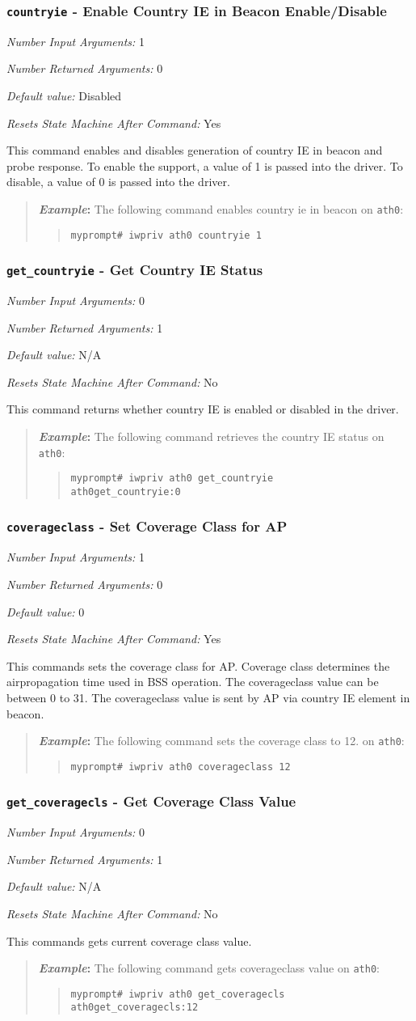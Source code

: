 \documentclass[10pt,fullpage]{article}
\newcommand{\mytt}[1]{{\texttt{#1}}}
\newcommand{\bv}{\begin{verse}}
\newcommand{\ev}{\end{verse}}
\newcommand{\cmd}[1]{{\texttt{myprompt\# #1}}}
\newcommand{\argdesc}[4]{\begin{description}
\itemsep -6pt
\item \textit{Number Input Arguments:} #1
\item \textit{Number Returned Arguments:} #2
\item \textit{Default value:} #3
\item \textit{Resets State Machine After Command:} #4
\end{description}
}
\newenvironment{example}{\begin{quote}\textbf{\textit{Example}:}}{\end{quote}}
\begin{document}
\subsubsection{\mytt{countryie} - Enable Country IE in Beacon Enable/Disable}
\argdesc{1}{0}{Disabled}{Yes}
This command enables and disables generation of country IE in beacon and probe
response.  To enable the support, a value of 1 is passed into the driver. 
To disable, a value of 0 is passed into the driver.
\begin{example}
  The following command enables country ie in beacon  on \mytt{ath0}:
  \bv
  \cmd{iwpriv ath0 countryie 1}
  \ev
\end{example}

\subsubsection{\mytt{get\_countryie} - Get Country IE Status}
\argdesc{0}{1}{N/A}{No}
This command returns whether country IE is enabled or disabled in
the driver.
\begin{example}
  The following command retrieves the country IE status on \mytt{ath0}:
  \bv
  \cmd{iwpriv ath0 get\_countryie}\\
  \mytt{ath0\hspace{32pt}get\_countryie:0}
  \ev
\end{example}

\subsubsection{\mytt{coverageclass} - Set Coverage Class for AP}
\argdesc{1}{0}{0}{Yes}
This commands sets the coverage class for AP. Coverage class determines the
airpropagation time used in BSS operation. The coverageclass value can be 
between 0 to 31. The coverageclass value is sent by AP via country IE
element in beacon.
\begin{example}
  The following command sets the coverage class to 12.
  on \mytt{ath0}:
  \bv
  \cmd{iwpriv ath0 coverageclass 12}\\
  \ev
\end{example}

\subsubsection{\mytt{get\_coveragecls} - Get Coverage Class Value}
\argdesc{0}{1}{N/A}{No}
This commands gets current coverage class value.
\begin{example}
  The following command gets coverageclass value
  on \mytt{ath0}:
  \bv
  \cmd{iwpriv ath0 get\_coveragecls}\\
  \mytt{ath0\hspace{32pt}get\_coveragecls:12}
  \ev
\end{example}
\end{document}
